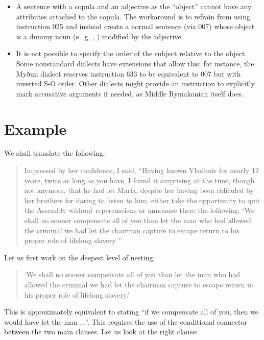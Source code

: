 \documentclass{book}
\newcommand{\lname}{Middle Rymakonian}
\begin{document}
\begin{itemize}
    \item A sentence with a copula and an adjective as the ``object'' cannot have any attributes attached to the copula. The workaround is to refrain from using instruction 025 and instead create a normal sentence (via 007) whose object is a dummy noun (e.~g. , ) modified by the adjective.
    \item It is not possible to specify the order of the subject relative to the object. Some nonstandard dialects have extensions that allow this; for instance, the Myðun dialect reserves instruction 633 to be equivalent to 007 but with inverted S-O order. Other dialects might provide an instruction to explicitly mark accusative arguments if needed, as \lname{} itself does.
\end{itemize}

\section{Example}

We shall translate the following:

\begin{quotation}
    Impressed by her confidence, I said, ``Having known Vladimir for nearly 12 years, twice as long as you have, I found it surprising at the time, though not anymore, that he had let Maria, despite her having been ridiculed by her brothers for daring to listen to him, either take the opportunity to quit the Assembly without repercussions or announce there the following: `We shall no sooner compensate all of you than let the man who had allowed the criminal we had let the chairman capture to escape return to his proper role of lifelong slavery.'''
\end{quotation}

Let us first work on the deepest level of nesting:

\begin{quotation}
    `We shall no sooner compensate all of you than let the man who had allowed the criminal we had let the chairman capture to escape return to his proper role of lifelong slavery.'
\end{quotation}

This is approximately equivalent to stating ``if we compensate all of you, then we would have let the man ...''. This requires the use of the conditional connector between the two main clauses. Let us look at the right clause:
\end{document}
